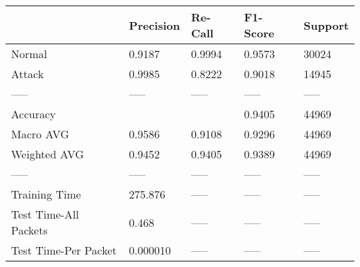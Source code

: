 \begin{tabular}{lllll}
\toprule
{} & Precision & Re-Call & F1-Score & Support \\
\midrule
Normal                &    0.9187 &  0.9994 &   0.9573 &   30024 \\
Attack                &    0.9985 &  0.8222 &   0.9018 &   14945 \\
-----                 &     ----- &   ----- &    ----- &   ----- \\
Accuracy              &           &         &   0.9405 &   44969 \\
Macro AVG             &    0.9586 &  0.9108 &   0.9296 &   44969 \\
Weighted AVG          &    0.9452 &  0.9405 &   0.9389 &   44969 \\
-----                 &     ----- &   ----- &    ----- &   ----- \\
Training Time         &   275.876 &   ----- &    ----- &   ----- \\
Test Time-All Packets &     0.468 &   ----- &    ----- &   ----- \\
Test Time-Per Packet  &  0.000010 &   ----- &    ----- &   ----- \\
\bottomrule
\end{tabular}

